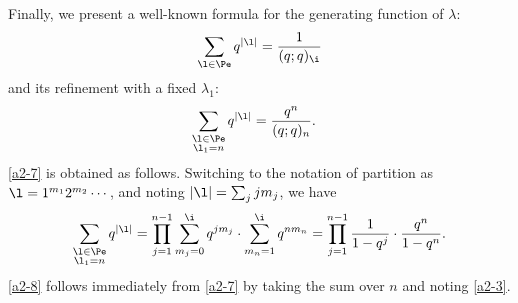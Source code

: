 Finally, we present a well-known formula for the generating function of $\lambda$:
\begin{equation}
 \label{a2-8}
 \sum_{\l\in\Pe}
 q^{|\l|}=\frac{1}{(q;q)_\i}
\end{equation}
and its refinement with a fixed $\lambda_1$:
\begin{align}
\label{a2-7}
 &\sum_{\substack{\l\in\Pe\\ \l_1=n}}
 q^{|\l|}=\frac{q^n}{(q;q)_n}.
\end{align}
 \eqref{a2-7} is obtained as follows. Switching to the notation of partition as $\l=1^{m_1}2^{m_2}\cdots$,
 and noting $|\l|=\sum_{j}jm_j$, we have
\begin{align*}
 \sum_{\substack{\l\in\Pe\\ \l_1=n}}
 q^{|\l|}
 =
 \prod_{j=1}^{n-1}\sum_{m_j=0}^{\i}
 q^{jm_j}\cdot \sum_{m_n=1}^{\i}q^{n m_n}=\prod_{j=1}^{n-1}\frac{1}{1-q^j}
 \cdot\frac{q^n}{1-q^n}.
\end{align*}
\eqref{a2-8} follows immediately from \eqref{a2-7} by taking the sum over $n$ and noting \eqref{a2-3}.



